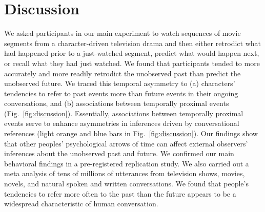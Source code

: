 \documentclass[10pt]{article}
\begin{document}
\section*{Discussion}

We asked participants in our main experiment to watch sequences of movie
segments from a character-driven television drama and then either retrodict
what had happened prior to a just-watched segment, predict what would happen
next, or recall what they had just watched. We found that participants tended
to more accurately and more readily retrodict the unobserved past than predict
the unobserved future. We traced this temporal asymmetry to (a) characters'
tendencies to refer to past events more than future events in their ongoing
conversations, and (b) associations between temporally proximal events
(Fig.~\ref{fig:discussion}). Essentially, associations between temporally
proximal events serve to enhance asymmetries in inferences driven by
conversational references (light orange and blue bars in
Fig.~\ref{fig:discussion}). Our findings show that other peoples' psychological
arrows of time can affect external observers' inferences about the unobserved
past and future. We confirmed our main behavioral findings in a pre-registered
replication study. We also carried out a meta analysis of tens of millions of
utterances from television shows, movies, novels, and natural spoken and
written conversations. We found that people's tendencies to refer more often to
the past than the future appears to be a widespread characteristic of human
conversation.
\end{document}
